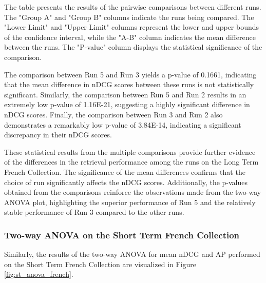 The table presents the results of the pairwise comparisons between different runs. 
The "Group A" and "Group B" columns indicate the runs being compared. 
The "Lower Limit" and "Upper Limit" columns represent the lower and upper bounds of the confidence interval, while the "A-B" column indicates the mean difference between the runs. 
The "P-value" column displays the statistical significance of the comparison.

The comparison between Run 5 and Run 3 yields a p-value of 0.1661, indicating that the mean difference in \ac{nDCG} scores between these runs is not statistically significant. 
Similarly, the comparison between Run 5 and Run 2 results in an extremely low p-value of 1.16E-21, suggesting a highly significant difference in \ac{nDCG} scores. 
Finally, the comparison between Run 3 and Run 2 also demonstrates a remarkably low p-value of 3.84E-14, indicating a significant discrepancy in their \ac{nDCG} scores.

These statistical results from the multiple comparisons provide further evidence of the differences in the retrieval performance among the runs on the Long Term French Collection. The significance of the mean differences confirms that the choice of run significantly affects the \ac{nDCG} scores. Additionally, the p-values obtained from the comparisons reinforce the observations made from the two-way \ac{ANOVA} plot, highlighting the superior performance of Run 5 and the relatively stable performance of Run 3 compared to the other runs.

\newpage
\subsubsection{Two-way ANOVA on the Short Term French Collection}

Similarly, the results of the two-way \ac{ANOVA} for mean \ac{nDCG} and \ac{AP} performed on the Short Term French Collection are visualized in Figure \ref{fig:st_anova_french}. 


